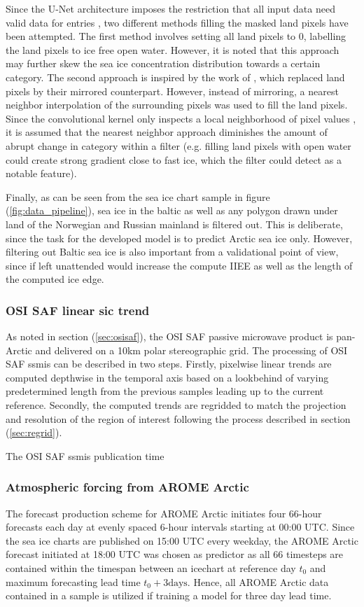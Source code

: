 \documentclass[../main/thesis]{subfiles}
\begin{document}
Since the U-Net architecture imposes the restriction that all input data need valid data for entries \citep{Ronneberger2015}, two different methods filling the masked land pixels have been attempted. The first method involves setting all land pixels to 0, labelling the land pixels to ice free open water. However, it is noted that this approach may further skew the sea ice concentration distribution towards a certain category. The second approach is inspired by the work of \citet{Wang2017}, which replaced land pixels by their mirrored counterpart. However, instead of mirroring, a nearest neighbor interpolation of the surrounding pixels was used to fill the land pixels. Since the convolutional kernel only inspects a local neighborhood of pixel values \citep{Yamashita2018}, it is assumed that the nearest neighbor approach diminishes the amount of abrupt change in category within a filter (e.g. filling land pixels with open water could create strong gradient close to fast ice, which the filter could detect as a notable feature).

Finally, as can be seen from the sea ice chart sample in figure (\ref{fig:data_pipeline}), sea ice in the baltic as well as any polygon drawn under land of the Norwegian and Russian mainland is filtered out. This is deliberate, since the task for the developed model is to predict Arctic sea ice only. However, filtering out Baltic sea ice is also important from a validational point of view, since if left unattended would increase the compute IIEE as well as the length of the computed ice edge.

\subsubsection{OSI SAF linear sic trend}
\label{sec:data_trend}
As noted in section (\ref{sec:osisaf}), the OSI SAF passive microwave product is pan-Arctic and delivered on a 10km polar stereographic grid. The processing of OSI SAF ssmis can be described in two steps. Firstly, pixelwise linear trends are computed depthwise in the temporal axis based on a lookbehind of varying predetermined length from the previous samples leading up to the current reference. Secondly, the computed trends are regridded to match the projection and resolution of the region of interest following the process described in section (\ref{sec:regrid}).

The OSI SAF ssmis publication time 

\subsubsection{Atmospheric forcing from AROME Arctic}
\label{sec:data_arome}
The forecast production scheme for AROME Arctic initiates four 66-hour forecasts each day at evenly spaced 6-hour intervals starting at 00:00 UTC. Since the sea ice charts are published on 15:00 UTC every weekday, the AROME Arctic forecast initiated at 18:00 UTC was chosen as predictor as all 66 timesteps are contained within the timespan between an icechart at reference day $t_0$ and maximum forecasting lead time $t_0 + 3 \text{days}$. Hence, all AROME Arctic data contained in a sample is utilized if training a model for three day lead time.
\end{document}
